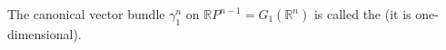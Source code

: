 The canonical vector bundle $\gamma_1^n$ on $\mathbb{R}P^{n-1} = G_1(\mathbb{R}^n)$ is called the  (it is one-dimensional).
